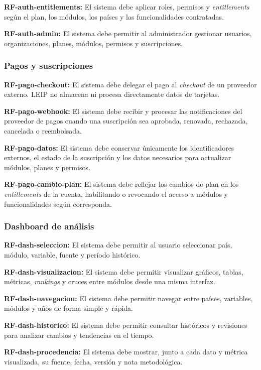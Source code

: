\documentclass[11pt,a4paper]{article}
\newcommand{\proyectoNombre}{LEIP}
\newcommand{\rf}[2]{%
  \noindent
  \textbf{RF-#1:} #2
  \par\smallskip
}
\begin{document}
\rf{auth-entitlements}{El sistema debe aplicar roles, permisos y
\emph{entitlements} seg\'un el plan, los m\'odulos, los pa\'ises y las
funcionalidades contratadas.}

\rf{auth-admin}{El sistema debe permitir al administrador gestionar usuarios,
organizaciones, planes, m\'odulos, permisos y suscripciones.}

\subsubsection{Pagos y suscripciones}

\rf{pago-checkout}{El sistema debe delegar el pago al \emph{checkout} de un
proveedor externo. \proyectoNombre{} no almacena ni procesa directamente datos
de tarjetas.}

\rf{pago-webhook}{El sistema debe recibir y procesar las notificaciones del
proveedor de pagos cuando una suscripci\'on sea aprobada, renovada, rechazada,
cancelada o reembolsada.}

\rf{pago-datos}{El sistema debe conservar \'unicamente los identificadores
externos, el estado de la suscripci\'on y los datos necesarios para actualizar
m\'odulos, planes y permisos.}

\rf{pago-cambio-plan}{El sistema debe reflejar los cambios de plan en los
\emph{entitlements} de la cuenta, habilitando o revocando el acceso a m\'odulos y
funcionalidades seg\'un corresponda.}

\subsubsection{Dashboard de análisis}

\rf{dash-seleccion}{El sistema debe permitir al usuario seleccionar pa\'is,
m\'odulo, variable, fuente y per\'iodo hist\'orico.}

\rf{dash-visualizacion}{El sistema debe permitir visualizar gr\'aficos, tablas,
m\'etricas, \emph{rankings} y cruces entre m\'odulos desde una misma interfaz.}

\rf{dash-navegacion}{El sistema debe permitir navegar entre pa\'ises, variables,
m\'odulos y a\~nos de forma simple y r\'apida.}

\rf{dash-historico}{El sistema debe permitir consultar hist\'oricos y revisiones
para analizar cambios y tendencias en el tiempo.}

\rf{dash-procedencia}{El sistema debe mostrar, junto a cada dato y m\'etrica
visualizada, su fuente, fecha, versi\'on y nota metodol\'ogica.}
\end{document}
